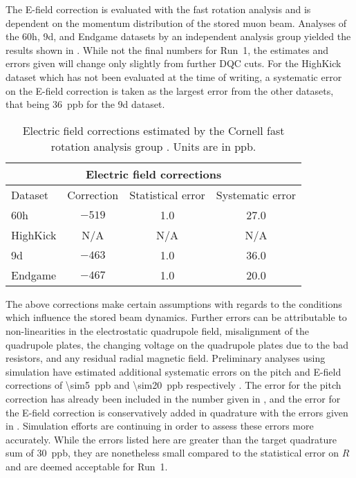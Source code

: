 

The E-field correction is evaluated with the fast rotation analysis and is dependent on the momentum distribution of the stored muon beam. Analyses of the 60h, 9d, and Endgame datasets by an independent analysis group yielded the results shown in . While not the final numbers for Run~1, the estimates and errors given will change only slightly from further DQC cuts. For the HighKick dataset which has not been evaluated at the time of writing, a systematic error on the E-field correction is taken as the largest error from the other datasets, that being \SI{36}{ppb} for the 9d dataset.


\begin{table}
\centering
\renewcommand{\arraystretch}{1.2}
\begin{tabular*}{\linewidth}{@{\extracolsep{\fill}}lccc}
  \hline
    \multicolumn{4}{c}{\textbf{Electric field corrections}} \\
  \hline\hline
    Dataset & Correction & Statistical error & Systematic error \\
  \hline
    60h & $-519$ & 1.0 & 27.0 \\
    HighKick & N/A & N/A & N/A \\
    9d & $-463$ & 1.0 & 36.0 \\
    Endgame & $-467$ & 1.0 & 20.0 \\
  \hline
\end{tabular*}
\caption[Electric field corrections estimated by the Cornell fast rotation analysis group]{Electric field corrections estimated by the Cornell fast rotation analysis group \cite{AntoineEField60h,AntoineEField9d,AntoineEFieldEndgame}. Units are in ppb.}
\label{tab:EfieldCorrections}
\end{table}



The above corrections make certain assumptions with regards to the conditions which influence the stored beam dynamics. Further errors can be attributable to non-linearities in the electrostatic quadrupole field, misalignment of the quadrupole plates, the changing voltage on the quadrupole plates due to the bad resistors, and any residual radial magnetic field. Preliminary analyses using simulation have estimated additional systematic errors on the pitch and E-field corrections of \SI{\sim5}{ppb} and \SI{\sim20}{ppb} respectively \cite{DaveRubinElbaBadResistors,DaveRubinBadResistorsUpdate}. The error for the pitch correction has already been included in the number given in , and the error for the E-field correction is conservatively added in quadrature with the errors given in . Simulation efforts are continuing in order to assess these errors more accurately. While the errors listed here are greater than the target quadrature sum of \SI{30}{ppb}, they are nonetheless small compared to the statistical error on $R$ and are deemed acceptable for Run~1.


